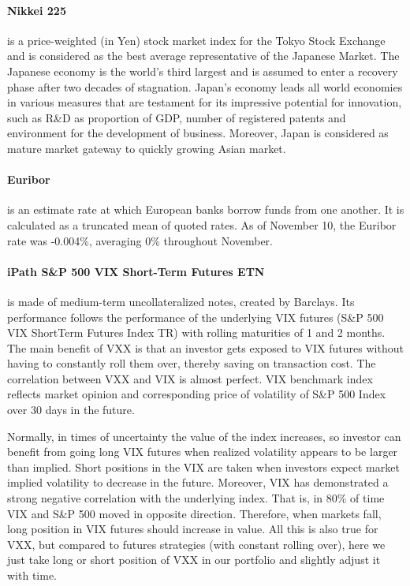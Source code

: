 \documentclass[11pt, parskip=full, DIV=14, headings=small, footsepline, footinclude=false, headsepline]{scrreprt}
\begin{document}
\paragraph{Nikkei 225} is a price-weighted (in Yen) stock market index for the Tokyo Stock Exchange and is considered as the best average representative of the Japanese Market.
The Japanese economy is the world’s third largest and is assumed to enter a recovery phase after two decades of stagnation.
Japan's economy leads all world economies in various measures that are testament for its impressive potential for innovation, such as R\&D as proportion of GDP, number of registered patents and environment for the development of business.
Moreover, Japan is considered as mature market gateway to quickly growing Asian market.

\paragraph{Euribor} is an estimate rate at which European banks borrow funds from one another.
It is calculated as a truncated mean of quoted rates.
As of November 10, the Euribor rate was -0.004\%, averaging 0\% throughout November.

\begin{figure}
  \centering
\end{figure}
%
\paragraph{iPath S\&P 500 VIX Short-Term Futures ETN} is made of medium-term uncollateralized notes, created by Barclays. Its performance follows the performance of the underlying VIX futures (S\&P 500 VIX ShortTerm Futures Index TR) with rolling maturities of 1 and 2 months.
The main benefit of VXX is that an investor gets exposed to VIX futures without having to constantly roll them over, thereby saving on transaction cost. The correlation between VXX and VIX is almost perfect.
VIX benchmark index reflects market opinion and corresponding price of volatility of S\&P 500 Index over 30 days in the future.


Normally, in times of uncertainty the value of the index increases, so investor can benefit from going long VIX futures when realized volatility appears to be larger than implied.
Short positions in the VIX are taken when investors expect market implied volatility to decrease in the future.
Moreover, VIX has demonstrated a strong negative correlation with the underlying index.
That is, in 80\% of time VIX and S\&P 500 moved in opposite direction.
Therefore, when markets fall, long position in VIX futures should increase in value.
All this is also true for VXX, but compared to futures strategies (with constant rolling over), here we just take long or short position of VXX in our portfolio and slightly adjust it with time.
\end{document}

